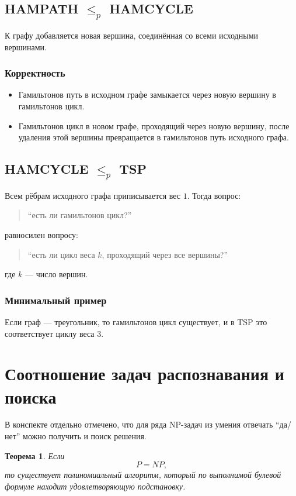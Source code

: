 \documentclass[12pt,a4paper]{article}
\theoremstyle{definition}
\theoremstyle{plain}
\newtheorem{theorem}{Теорема}[section]
\begin{document}
\subsection{\textsc{HAMPATH} \texorpdfstring{$\le_p$}{<=p} \textsc{HAMCYCLE}}
К графу добавляется новая вершина, соединённая со всеми исходными вершинами.

\subsubsection*{Корректность}
\begin{itemize}
\item Гамильтонов путь в исходном графе замыкается через новую вершину в гамильтонов цикл.
\item Гамильтонов цикл в новом графе, проходящий через новую вершину, после удаления этой вершины превращается в гамильтонов путь исходного графа.
\end{itemize}

\subsection{\textsc{HAMCYCLE} \texorpdfstring{$\le_p$}{<=p} \textsc{TSP}}
Всем рёбрам исходного графа приписывается вес $1$. Тогда вопрос:
\begin{quote}
``есть ли гамильтонов цикл?''
\end{quote}
равносилен вопросу:
\begin{quote}
``есть ли цикл веса $k$, проходящий через все вершины?''
\end{quote}
где $k$ --- число вершин.

\subsubsection*{Минимальный пример}
Если граф --- треугольник, то гамильтонов цикл существует, и в \textsc{TSP} это соответствует циклу веса $3$.

\section{Соотношение задач распознавания и поиска}

В конспекте отдельно отмечено, что для ряда NP-задач из умения отвечать ``да/нет'' можно получить и поиск решения.

\begin{theorem}
Если
\[
P=NP,
\]
то существует полиномиальный алгоритм, который по выполнимой булевой формуле находит удовлетворяющую подстановку.
\end{theorem}
\end{document}
